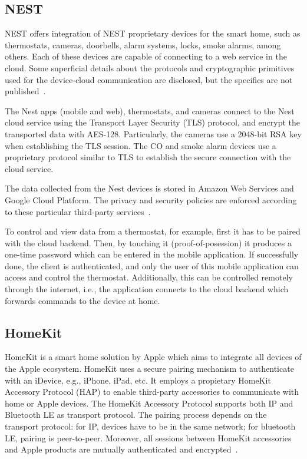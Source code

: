 \documentclass[12pt]{article}
\begin{document}
\subsection{NEST}
NEST offers integration of NEST proprietary devices for the smart home, such as thermostats, cameras, doorbells, alarm systems, locks, smoke alarms, among others. Each of these devices are capable of connecting to a web service in the cloud. Some superficial details about the protocols and cryptographic primitives used for the device-cloud communication are disclosed, but the specifics are not published~\cite{related_01}.

The Nest apps (mobile and web), thermostats, and cameras connect to the Nest cloud service using the Transport Layer Security (TLS) protocol, and encrypt the transported data with AES-128. Particularly, the cameras use a 2048-bit RSA key when establishing the TLS session. The CO and smoke alarm devices use a proprietary protocol similar to TLS to establish the secure connection with the cloud service.

The data collected from the Nest devices is stored in Amazon Web Services and Google Cloud Platform. The privacy and security policies are enforced according to these particular third-party services~\cite{related_01}.

To control and view data from a thermostat, for example, first it has to be paired with the cloud backend. Then, by touching it (proof-of-posession) it produces a one-time password which can be entered in the mobile application. If successfully done, the client is authenticated, and only the user of this mobile application can access and control the thermostat. Additionally, this can be controlled remotely through the internet, i.e., the application connects to the cloud backend which forwards commands to the device at home.

\subsection{HomeKit}

HomeKit is a smart home solution by Apple which aims to integrate all devices of the Apple ecosystem. HomeKit uses a secure pairing mechanism to authenticate with an iDevice, e.g., iPhone, iPad, etc. It employs a propietary HomeKit Accessory Protocol (HAP) to enable third-party accessories to communicate with home or Apple devices. The HomeKit Accessory Protocol supports both IP and Bluetooth LE as transport protocol. The pairing process depends on the transport protocol: for IP, devices have to be in the same network; for bluetooth LE, pairing is peer-to-peer. Moreover, all sessions between HomeKit accessories and Apple products are mutually authenticated and encrypted~\cite{related_02}.
\end{document}
